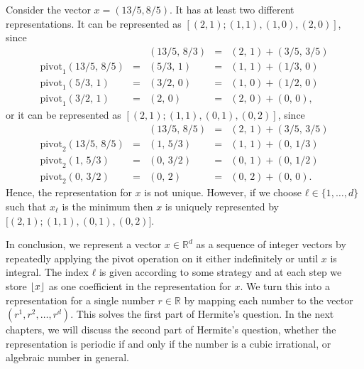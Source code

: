 \begin{example}
  Consider the vector $x = (13/5, 8/5)$.
  It has at least two different representations.
  It can be represented as $[(2, 1); (1, 1), (1, 0), (2, 0)]$, since
  \[
    \begin{array}{lclcl}
                                  &   & (13/5, \, 8/3) & = & (2, \, 1) + (3/5, \, 3/5) \\
      \mathrm{pivot}_1(13/5, \, 8/5) & = & (5/3, \,  1)   & = & (1, \, 1) + (1/3, \, 0)   \\
      \mathrm{pivot}_1(5/3, \, 1)    & = & (3/2, \,  0)   & = & (1, \, 0) + (1/2, \, 0)   \\
      \mathrm{pivot}_1(3/2, \, 1)    & = & (2, \,    0)   & = & (2, \, 0) + (0, \, 0),
    \end{array}
  \]
  or it can be represented as $[(2, 1); (1, 1), (0, 1), (0, 2)]$, since
  \[
    \begin{array}{lclcl}
                                  &   & (13/5, \, 8/5) & = & (2, \, 1) + (3/5, \, 3/5) \\
      \mathrm{pivot}_2(13/5, \, 8/5) & = & (1, \, 5/3)    & = & (1, \, 1) + (0, \, 1/3)   \\
      \mathrm{pivot}_2(1, \, 5/3)    & = & (0, \, 3/2)    & = & (0, \, 1) + (0, \, 1/2)   \\
      \mathrm{pivot}_2(0, \, 3/2)    & = & (0, \, 2)      & = & (0, \, 2) + (0, \, 0).
    \end{array}
  \]
  Hence, the representation for $x$ is not unique.
  However, if we choose $ℓ ∈ \{1, …, d\}$ such that $x_ℓ$ is the minimum
  then $x$ is uniquely represented by $\bigl[(2, 1); (1, 1), (0, 1), (0, 2)\bigr]$.
\end{example}

In conclusion,
we represent a vector $x ∈ ℝ^d$ as a sequence of integer vectors by repeatedly
applying the $\mathrm{pivot}$ operation on it either indefinitely or until $x$ is integral.
The index $ℓ$ is given according to some strategy and at each step we store
$\left\lfloor x\right\rfloor$ as one coefficient in the representation for $x$.
We turn this into a representation for a single number $r ∈ ℝ$ by mapping each
number to the vector $(r^1, r^2, …, r^d)$.
This solves the first part of Hermite's question.
In the next chapters, we will discuss the second part of Hermite's question,
whether the representation is periodic if and only if the number is a cubic
irrational, or algebraic number in general.

